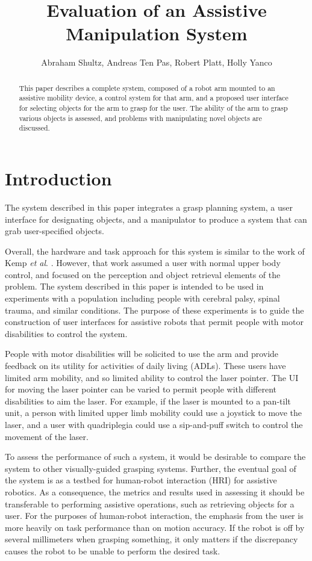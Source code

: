 \documentclass[letterpaper, 10 pt, conference]{ieeeconf}
\title{\LARGE \bf
Evaluation of an Assistive Manipulation System
}
\author{Abraham Shultz, Andreas Ten Pas, Robert Platt, Holly Yanco}
\begin{document}
\maketitle
\thispagestyle{empty}
\pagestyle{empty}

\begin{abstract}
This paper describes a complete system, composed of a robot arm mounted to an assistive mobility device, a control system for that arm, and a proposed user interface for selecting objects for the arm to grasp for the user. 
The ability of the arm to grasp various objects is assessed, and problems with manipulating novel objects are discussed. 
\end{abstract}

\section{Introduction}

The system described in this paper integrates a grasp planning system, a user interface for designating objects, and a manipulator to produce a system that can grab user-specified objects. 

Overall, the hardware and task approach for this system is similar to the work of Kemp \emph{et al}. \cite{kemp2008point}. 
However, that work assumed a user with normal upper body control, and focused on the perception and object retrieval elements of the problem. 
The system described in this paper is intended to be used in experiments with a population including people with cerebral palsy, spinal trauma, and similar conditions. 
The purpose of these experiments is to guide the construction of user interfaces for assistive robots that permit people with motor disabilities to control the system.

People with motor disabilities will be solicited to use the arm and provide feedback on its utility for activities of daily living (ADLs).
These users have limited arm mobility, and so limited ability to control the laser pointer.
The UI for moving the laser pointer can be varied to permit people with different disabilities to aim the laser. 
For example, if the laser is mounted to a pan-tilt unit, a person with limited upper limb mobility could use a joystick to move the laser, and a user with quadriplegia could use a sip-and-puff switch to control the movement of the laser.

To assess the performance of such a system, it would be desirable to compare the system to other visually-guided grasping systems. 
Further, the eventual goal of the system is as a testbed for human-robot interaction (HRI) for assistive robotics. 
As a consequence, the metrics and results used in assessing it should be transferable to performing assistive operations, such as retrieving objects for a user. 
For the purposes of human-robot interaction, the emphasis from the user is more heavily on task performance than on motion accuracy.
If the robot is off by several millimeters when grasping something, it only matters if the discrepancy causes the robot to be unable to perform the desired task. 
\end{document}
